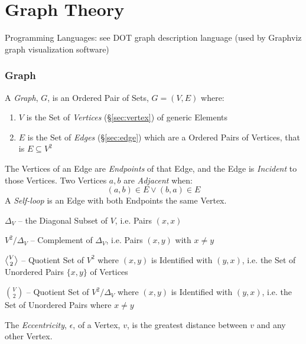 \part{Graph Theory}\label{part:graph_theory}

Programming Languages: \fist see DOT graph description language (used by
Graphviz graph visualization software)



\section{Graph}\label{sec:graph}

A \emph{Graph}, $G$, is an Ordered Pair of Sets, $G = (V,E)$ where:
\begin{enumerate}
  \item $V$ is the Set of \emph{Vertices} (\S\ref{sec:vertex}) of
    generic Elements
  \item $E$ is the Set of \emph{Edges} (\S\ref{sec:edge}) which are a
    Ordered Pairs of Vertices, that is $E \subseteq V^2$
\end{enumerate}
The Vertices of an Edge are \emph{Endpoints} of that Edge, and the
Edge is \emph{Incident} to those Vertices. Two Vertices $a,b$ are
\emph{Adjacent} when:
\[
    (a,b) \in E \vee (b,a) \in E
\]
A \emph{Self-loop} is an Edge with both Endpoints the same Vertex.

$\Delta_V$ -- the Diagonal Subset of $V$, i.e. Pairs $(x,x)$

$V^2/\Delta_V$ -- Complement of $\Delta_V$, i.e. Pairs
$(x,y)$ with $x \neq y$

$\angleover{V}{2}$ -- Quotient Set of $V^2$ where $(x,y)$ is
Identified with $(y,x)$, i.e. the Set of Unordered Pairs $\{x,y\}$ of
Vertices

${V}\choose{2}$ -- Quotient Set of $V^2/\Delta_V$ where $(x,y)$ is
Identified with $(y,x)$, i.e. the Set of Unordered Pairs where $x \neq
y$

The \emph{Eccentricity}, $\epsilon$, of a Vertex, $v$, is the greatest
distance between $v$ and any other Vertex.

